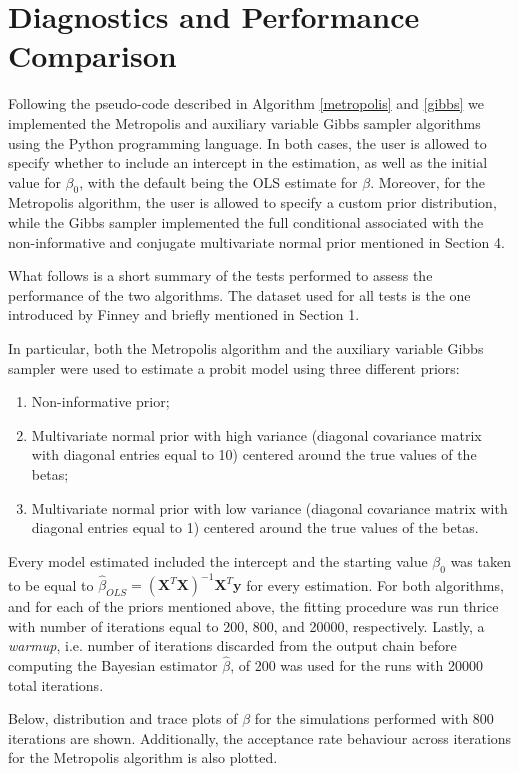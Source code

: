 \documentclass{article}
\renewcommand{\vec}[1]{\mathbf{#1}}
\begin{document}
\section{Diagnostics and Performance Comparison}

Following the pseudo-code described in Algorithm \ref{metropolis} and \ref{gibbs} we implemented the Metropolis and auxiliary variable Gibbs sampler algorithms using the Python programming language. In both cases, the user is allowed to specify whether to include an intercept in the estimation, as well as the initial value for \(\beta_0\), with the default being the OLS estimate for \(\beta\). Moreover, for the Metropolis algorithm, the user is allowed to specify a custom prior distribution, while the Gibbs sampler implemented the full conditional associated with the non-informative and conjugate multivariate normal prior mentioned in Section 4.
\par
What follows is a short summary of the tests performed to assess the performance of the two algorithms. The dataset used for all tests is the one introduced by Finney  \cite{finney1947estimation} and briefly mentioned in Section 1.
\par
In particular, both the Metropolis algorithm and the auxiliary variable Gibbs sampler were used to estimate a probit model using three different priors:
\begin{enumerate}
    \item Non-informative prior; 
    \item Multivariate normal prior with high variance (diagonal covariance matrix with diagonal entries equal to 10) centered around the true values of the betas;
    \item Multivariate normal prior with low variance (diagonal covariance matrix with diagonal entries equal to 1) centered around the true values of the betas.
\end{enumerate}
Every model estimated included the intercept and the starting value \(\beta_0\) was taken to be equal to \(\hat\beta_{OLS} = (\vec{X}^T \vec{X})^{-1}\vec{X}^T \vec{y}\) for every estimation. For both algorithms, and for each of the priors mentioned above, the fitting procedure was run thrice with number of iterations equal to 200, 800, and 20000, respectively. Lastly, a \textit{warmup}, i.e. number of iterations discarded from the output chain before computing the Bayesian estimator \(\hat{\beta}\), of 200 was used for the runs with 20000 total iterations.
\par
Below, distribution and trace plots of \(\beta\) for the simulations performed with 800 iterations are shown. Additionally, the acceptance rate behaviour across iterations for the Metropolis algorithm is also plotted.  
\end{document}

